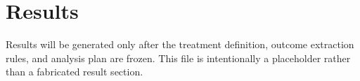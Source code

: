 \section{Results}
Results will be generated only after the treatment definition, outcome extraction rules, and analysis plan are frozen. This file is intentionally a placeholder rather than a fabricated result section.
